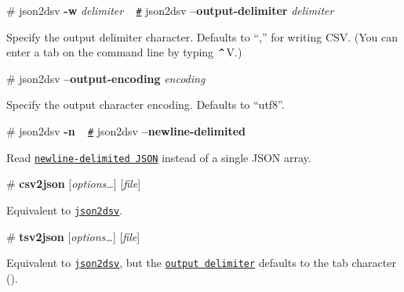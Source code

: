 \label{_json2dsv_output_delimiter}%
\# json2dsv {\bfseries -\/w} {\itshape delimiter} ~\newline
\href{json2dsv_output_delimiter}{\tt \#} json2dsv {\bfseries --output-\/delimiter} {\itshape delimiter}

Specify the output delimiter character. Defaults to “,” for writing C\+SV. (You can enter a tab on the command line by typing ⌃V.)

\label{_json2dsv_output_encoding}%
\# json2dsv {\bfseries --output-\/encoding} {\itshape encoding}

Specify the output character encoding. Defaults to “utf8”.

\label{_json2dsv_newline_delimited}%
\# json2dsv {\bfseries -\/n} ~\newline
\href{json2dsv_newline_delimited}{\tt \#} json2dsv {\bfseries --newline-\/delimited}

Read \href{https://github.com/mbostock/ndjson-cli}{\tt newline-\/delimited J\+S\+ON} instead of a single J\+S\+ON array.

\label{_csv2json}%
\# {\bfseries csv2json} \mbox{[}{\itshape options…}\mbox{]} \mbox{[}{\itshape file}\mbox{]}

Equivalent to \href{#json2dsv}{\tt json2dsv}.

\label{_tsv2json}%
\# {\bfseries tsv2json} \mbox{[}{\itshape options…}\mbox{]} \mbox{[}{\itshape file}\mbox{]}

Equivalent to \href{#json2dsv}{\tt json2dsv}, but the \href{#json2dsv_output_delimiter}{\tt output delimiter} defaults to the tab character (). 